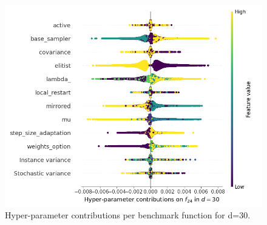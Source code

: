 \begin{figure}[t]
	\includegraphics[height=0.15\textheight,trim=60mm 0mm 0mm 0mm,clip]{cma_img_new/img_summary_f24_d30.png}
\caption{Hyper-parameter contributions per benchmark function for d=30. \label{fig:shapxplaind30}}

\end{figure}

